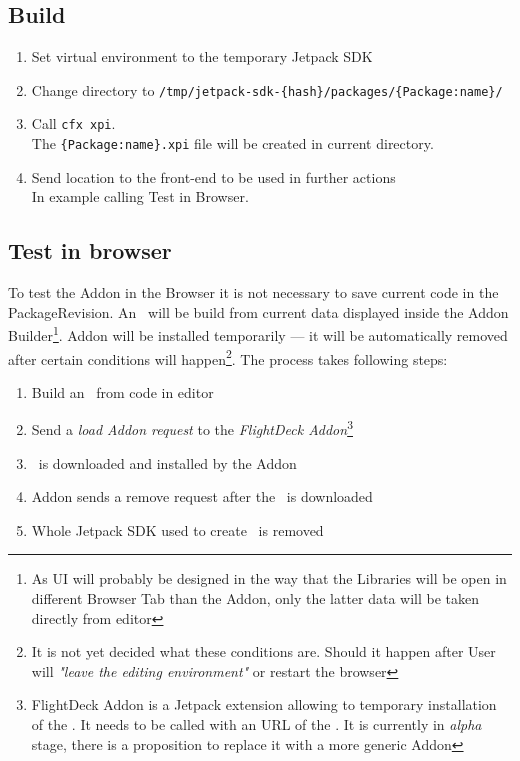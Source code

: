 \documentclass[10pt]{article}
\begin{document}
	\subsection{Build \xpi}
		\begin{enumerate}
			\item{Set virtual environment to the temporary Jetpack SDK}
			\item{Change directory to {\tt /tmp/jetpack-sdk-\{hash\}/packages/\{Package:name\}/}}
			\item{Call {\tt cfx xpi}.\\
				The {\tt \{Package:name\}.xpi} file will be created in current directory.} 
			\item{Send location to the front-end to be used in further actions\\
				In example calling Test in Browser.}
		\end{enumerate}
		
	\subsection{Test in browser}
		
		To test the Addon in the Browser it is not necessary to save current code in the PackageRevision.
		An \xpi\ will be build from current data displayed inside the Addon Builder\footnote{As UI will 
		probably be designed in the way that the Libraries will be open in different Browser Tab than the 
		Addon, only the latter	data will be taken directly from editor}. Addon will be installed temporarily
		--- it will be automatically removed after certain conditions will happen\footnote{It is not yet 
		decided what these conditions are. Should it happen after User will {\em "leave the editing 
		environment"} or restart the browser}. 
		The process takes following steps:
		\begin{enumerate}
			\item{Build an \xpi\ from code in editor}
			\item{Send a {\em load Addon request} to the {\em FlightDeck Addon}\footnote{FlightDeck Addon is a 
				Jetpack extension 	allowing to temporary installation of the \xpi. It needs to be called 
				with an URL of the \xpi. It is currently in {\em alpha} stage, there is a proposition 
				to replace it with a more generic Addon}}
			\item{\xpi\ is downloaded and installed by the Addon}
			\item{Addon sends a remove request after the \xpi\ is downloaded}
			\item{Whole Jetpack SDK used to create \xpi\ is removed}
		\end{enumerate}
	
\end{document}
